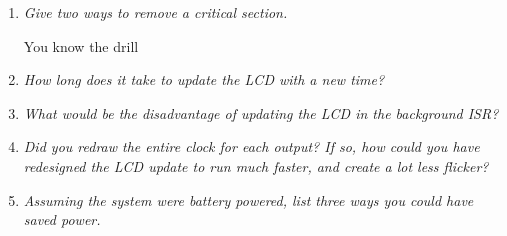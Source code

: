 \documentclass{article}
\begin{document}
\begin{enumerate}
	\item \emph{Give two ways to remove a critical section.}

		You know the drill

	\item \emph{How long does it take to update the LCD with a new time?}

		

	\item \emph{What would be the disadvantage of updating the LCD in the background ISR?}

		

	\item \emph{Did you redraw the entire clock for each output? If so, how
		could you have redesigned the LCD update to run much faster, and create
		a lot less flicker?}

		

	\item \emph{Assuming the system were battery powered, list three ways you
		could have saved power.}

		

\end{enumerate}
\end{document}
